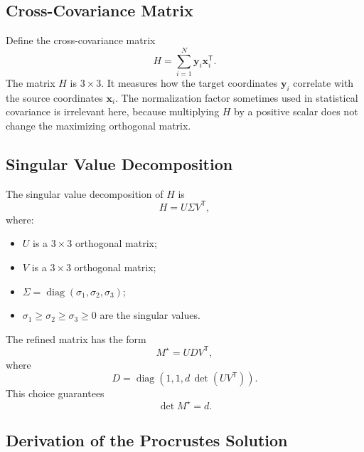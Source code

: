 \documentclass[11pt]{article}
\newcommand{\T}{\mathsf{T}}
\begin{document}
\subsection{Cross-Covariance Matrix}

Define the cross-covariance matrix
\[
    H
    =
    \sum_{i=1}^{N}
    \mathbf y_i\mathbf x_i^{\T}.
\]
The matrix \(H\) is \(3\times3\).  It measures how the target coordinates
\(\mathbf y_i\) correlate with the source coordinates \(\mathbf x_i\).  The
normalization factor sometimes used in statistical covariance is irrelevant
here, because multiplying \(H\) by a positive scalar does not change the
maximizing orthogonal matrix.

\subsection{Singular Value Decomposition}

The singular value decomposition of \(H\) is
\[
    H=U\Sigma V^{\T},
\]
where:
\begin{itemize}
    \item \(U\) is a \(3\times3\) orthogonal matrix;
    \item \(V\) is a \(3\times3\) orthogonal matrix;
    \item \(\Sigma=\operatorname{diag}(\sigma_1,\sigma_2,\sigma_3)\);
    \item \(\sigma_1\ge\sigma_2\ge\sigma_3\ge0\) are the singular values.
\end{itemize}
The refined matrix has the form
\[
    M^\star
    =
    UDV^{\T},
\]
where
\[
    D=
    \operatorname{diag}
    \left(1,1,d\,\det(UV^{\T})\right).
\]
This choice guarantees
\[
    \det M^\star=d.
\]

\subsection{Derivation of the Procrustes Solution}
\end{document}
